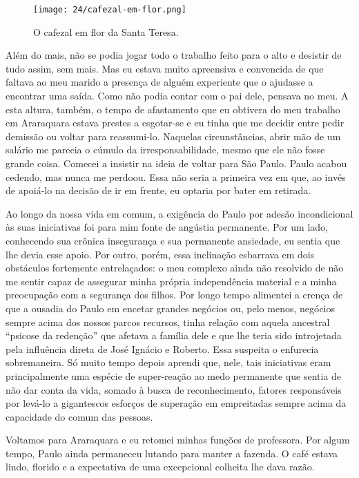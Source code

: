 \begin{figure}
\centering
\texttt{[image: 24/cafezal-em-flor.png]}
\caption{O cafezal em flor da Santa Teresa.}
\end{figure}


Além do mais, não se podia jogar todo o trabalho feito para o alto e desistir de tudo assim, sem mais.
Mas eu estava muito apreensiva e convencida de que faltava ao meu marido a presença de alguém experiente que o ajudasse a encontrar uma saída.
Como não podia contar com o pai dele, pensava no meu.
A esta altura, também, o tempo de afastamento que eu obtivera do meu trabalho em Araraquara estava prestes a esgotar-se e eu tinha que me decidir entre pedir demissão ou voltar para reassumi-lo.
Naquelas circunstâncias, abrir mão de um salário me parecia o cúmulo da irresponsabilidade, mesmo que ele não fosse grande coisa.
Comecei a insistir na ideia de voltar para São Paulo.
Paulo acabou cedendo, mas nunca me perdoou.
Essa não seria a primeira vez em que, ao invés de apoiá-lo na decisão de ir em frente, eu optaria por bater em retirada.

Ao longo da nossa vida em comum, a exigência do Paulo por adesão incondicional às suas iniciativas foi para mim fonte de angústia permanente.
Por um lado, conhecendo sua crônica insegurança e sua permanente ansiedade, eu sentia que lhe devia esse apoio.
Por outro, porém, essa inclinação esbarrava em dois obstáculos fortemente entrelaçados: o meu complexo ainda não resolvido de não me sentir capaz de assegurar minha própria independência material e a minha preocupação com a segurança dos filhos.
 Por longo tempo alimentei a crença de que a ousadia do Paulo em encetar grandes negócios ou, pelo menos, negócios sempre acima dos nossos parcos recursos, tinha relação com aquela ancestral ``psicose da redenção'' que afetava a família dele e que lhe teria sido introjetada pela influência direta de José Ignácio e Roberto.
Essa suspeita o enfurecia sobremaneira.
Só muito tempo depois aprendi que, nele, tais iniciativas eram principalmente uma espécie de super-reação ao medo permanente que sentia de não dar conta da vida, somado à busca de reconhecimento, fatores responsáveis por levá-lo a gigantescos esforços de superação em empreitadas sempre acima da capacidade do comum das pessoas.

Voltamos para Araraquara e eu retomei minhas funções de professora.
Por algum tempo, Paulo ainda permaneceu lutando para manter a fazenda.
O café estava lindo, florido e a expectativa de uma excepcional colheita lhe dava razão.

